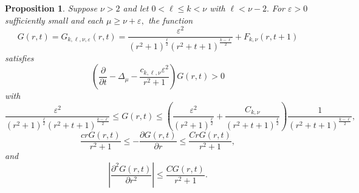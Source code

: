 \documentclass[12pt]{amsart}
\newcommand{\p}{{ \partial}}
\renewcommand{\1}{{\mathbf 1}}
\renewcommand{\p}{{\partial}}
\newcommand{\eps}{{\varepsilon}}
\newtheorem{prop}[thm]{Proposition}
\theoremstyle{others}
\numberwithin{equation}{section}
\begin{document}
\begin{prop}\label{prop:secondsupersol}
Suppose $\nu > 2$ and let $0 < \ell \leq k < \nu$ with $\ell < \nu - 2.$ For $\eps > 0$ sufficiently small and each $\mu \geq \nu + \eps,$ %
the function
$$G(r,t) = G_{k, \ell, \nu, \eps}(r,t) = \frac{\eps^2}{(r^2 + 1)^{\frac{\ell}{2} } (r^2 + t + 1)^{\frac{k - \ell}{2}}} + F_{k, \nu}(r,t + 1)$$
satisfies
\begin{equation}\label{secondsupersol:evolutionlowerbound}
\left( \frac{\p}{\p t} - \Delta_{\mu} - \frac{ c_{k, \ell, \nu} \eps^2 } { r^2 + 1 } \right) G(r,t) > 0
\end{equation}
with
\begin{equation}\label{secondsupersol:Gupperlowerbound}
\frac{\eps^2}{(r^2 + 1)^{\frac{\ell}{2} } (r^2 + t + 1)^{\frac{k - \ell}{2}}} \leq G(r,t) \leq  \left( \frac{\eps^2}{(r^2 + 1)^{\frac{\ell}{2} }} + \frac{C_{k, \nu} }{ (r^2 + t + 1)^{\frac{\ell}{2}} }  \right) \frac{1}{ (r^2 + t + 1)^{\frac{k - \ell}{2}} },
\end{equation}
\begin{equation}\label{secondsupersol:dGdrbound}
\frac{c r G(r,t)}{r^2 + 1} \leq -\frac{\p G(r,t) }{\p r} \leq \frac{C r G(r,t)}{r^2 + 1} ,
\end{equation}
and
\begin{equation}\label{secondsupersol:d2Gdr2bound}
\left| \frac{\p^2 G(r,t) }{\p r^2} \right| \leq \frac{C G(r,t)}{r^2 + 1}.
\end{equation}
\end{prop}
\end{document}
